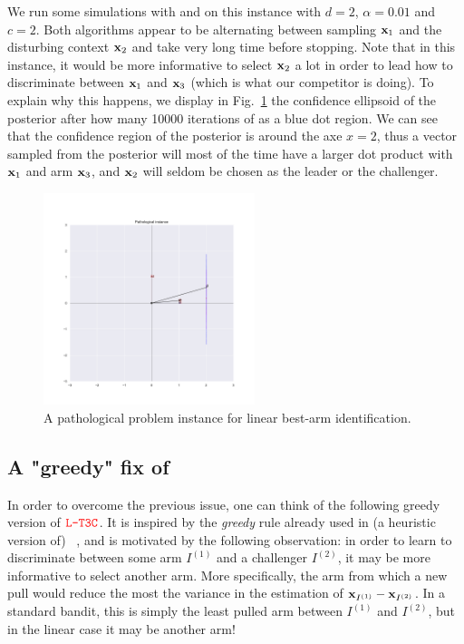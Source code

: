 We run some simulations with \TTTS{} and \TCC{} on this instance with $d=2$, $\alpha=0.01$ and $c=2$. Both algorithms appear to be alternating between sampling ${\bf x}_1$ and the disturbing context ${\bf x}_2$ and take very long time before stopping. Note that in this instance, it would be more informative to select ${\bf x}_2$ a lot in order to lead how to discriminate between ${\bf x}_1$ and ${\bf x}_3$ (which is what our competitor \LGapE{} is doing). To explain why this happens, we display in Fig.~\ref{fig:instance} the confidence ellipsoid of the posterior after how many 10000 iterations of \TCC{} as a blue dot region. We can see that the confidence region of the posterior is around the axe $x=2$, thus a vector sampled from the posterior will most of the time have a larger dot product with ${\bf x}_1$ and arm ${\bf x}_3$, and ${\bf x}_2$ will seldom be chosen as the leader or the challenger. 

\begin{figure}[ht]
    \centering
    \includegraphics[width=0.55\textwidth]{Chapter4/img/instance.pdf}
    \caption{A pathological problem instance for linear best-arm identification.}
    \label{fig:instance}
\end{figure}

\subsection{A "greedy" fix of \LTCC{}}\label{sec:lgc.bayesian.fix}

In order to overcome the previous issue, one can think of the following greedy version of $\textcolor{red}{\texttt{L-T3C}}$. It is inspired by the \emph{greedy} rule already used in (a heuristic version of) \LGapE~\citep{xu2018linear}, and is motivated by the following observation: in order to learn to discriminate between some arm $I^{(1)}$ and a challenger $I^{(2)}$, it may be more informative to select another arm. More specifically, the arm from which a new pull would reduce the most the variance in the estimation of ${\bf x}_{I^{(1)}} - {\bf x}_{I^{(2)}}$. In a standard bandit, this is simply the least pulled arm between $I^{(1)}$ and $I^{(2)}$, but in the linear case it may be another arm! 

